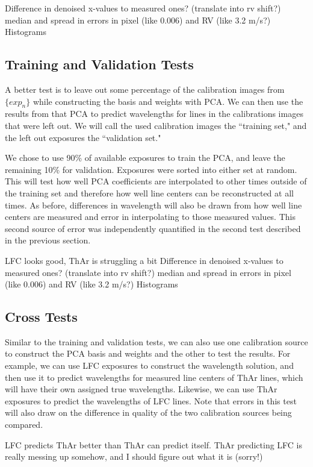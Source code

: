 \documentclass[12pt, letterpaper]{article}
\begin{document}
Difference in denoised x-values to measured ones? (translate into rv shift?)
median and spread in errors in pixel (like 0.006) and RV (like 3.2 m/s?)
Histograms

\subsection{Training and Validation Tests} \label{sec:test-trainNvalid}
A better test is to leave out some percentage of the calibration images from $\{exp_n\}$ while constructing the basis and weights with PCA.  We can then use the results from that PCA to predict wavelengths for lines in the calibrations images that were left out.  We will call the used calibration images the ``training set," and the left out exposures the ``validation set."

We chose to use 90\% of available exposures to train the PCA, and leave the remaining 10\% for validation.  Exposures were sorted into either set at random.  This will test how well PCA coefficients are interpolated to other times outside of the training set and therefore how well line centers can be reconstructed at all times.  As before, differences in wavelength will also be drawn from how well line centers are measured and error in interpolating to those measured values.  This second source of error was independently quantified in the second test described in the previous section.

LFC looks good, ThAr is struggling a bit
Difference in denoised x-values to measured ones? (translate into rv shift?)
median and spread in errors in pixel (like 0.006) and RV (like 3.2 m/s?)
Histograms

\subsection{Cross Tests} \label{sec:test-cross}
Similar to the training and validation tests, we can also use one calibration source to construct the PCA basis and weights and the other to test the results.  For example, we can use LFC exposures to construct the wavelength solution, and then use it to predict wavelengths for measured line centers of ThAr lines, which will have their own assigned true wavelengths.  Likewise, we can use ThAr exposures to predict the wavelengths of LFC lines.  Note that errors in this test will also draw on the difference in quality of the two calibration sources being compared.

LFC predicts ThAr better than ThAr can predict itself.
ThAr predicting LFC is really messing up somehow, and I should figure out what it is (sorry!)
\end{document}
